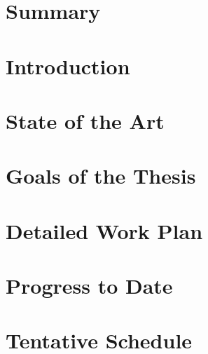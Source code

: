 \documentclass[%
   11pt,              %
   english,           %
   a4paper,           %
   DIV12,             %
	 parskip=half
]{scrartcl}%
\renewcommand{\color}[2]{#2} %
\newif\ifMaxPages
\newcommand{\onlyIfMaxPages}[1]{\ifMaxPages{\color{red}{#1}}\fi}
\begin{document}


\section{Summary\onlyIfMaxPages{ (max. 1/2 page)}}


\onlyIfMaxPages{\pagebreak}
\section{Introduction\onlyIfMaxPages{ (min. 1/2 page)}}


\onlyIfMaxPages{\pagebreak}
\section{State of the Art\onlyIfMaxPages{ (min. 1 page)}}


\onlyIfMaxPages{\pagebreak}
\pagebreak
\section{Goals of the Thesis\onlyIfMaxPages{ (min. 1 page)}}\label{sec:goal_of_thesis}


\onlyIfMaxPages{\pagebreak}
\section{Detailed Work Plan\onlyIfMaxPages{ (min. 1/2 page)}}
\label{sec:detailed_work_plan}

\onlyIfMaxPages{\pagebreak}
\section{Progress to Date\onlyIfMaxPages{ (min. 1/4 page)}}



\onlyIfMaxPages{\pagebreak}
\section{Tentative Schedule\onlyIfMaxPages{ (min. 1/4 page)}}


% 
\end{document}
